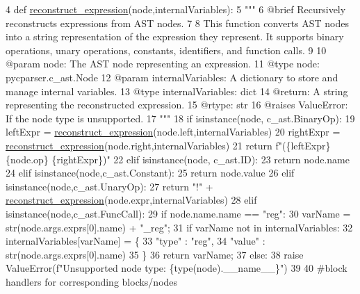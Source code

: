 \begin{DoxyCode}
4 \textcolor{keyword}{def }\hyperlink{namespaceblockHandlers_a5dcb5985c58176982a44686f616daa7f}{reconstruct\_expression}(node,internalVariables):
5     \textcolor{stringliteral}{"""
}
6 \textcolor{stringliteral}{    @brief Recursively reconstructs expressions from AST nodes.
}
7 \textcolor{stringliteral}{
}
8 \textcolor{stringliteral}{    This function converts AST nodes into a string representation of the expression they represent. It
       supports binary operations, unary operations, constants, identifiers, and function calls.
}
9 \textcolor{stringliteral}{
}
10 \textcolor{stringliteral}{    @param node: The AST node representing an expression.
}
11 \textcolor{stringliteral}{    @type node: pycparser.c\_ast.Node
}
12 \textcolor{stringliteral}{    @param internalVariables: A dictionary to store and manage internal variables.
}
13 \textcolor{stringliteral}{    @type internalVariables: dict
}
14 \textcolor{stringliteral}{    @return: A string representing the reconstructed expression.
}
15 \textcolor{stringliteral}{    @rtype: str
}
16 \textcolor{stringliteral}{    @raises ValueError: If the node type is unsupported.
}
17 \textcolor{stringliteral}{    """}
18     \textcolor{keywordflow}{if} isinstance(node, c\_ast.BinaryOp):
19         leftExpr = \hyperlink{namespaceblockHandlers_a5dcb5985c58176982a44686f616daa7f}{reconstruct\_expression}(node.left,internalVariables)
20         rightExpr = \hyperlink{namespaceblockHandlers_a5dcb5985c58176982a44686f616daa7f}{reconstruct\_expression}(node.right,internalVariables)
21         \textcolor{keywordflow}{return} f\textcolor{stringliteral}{"(\{leftExpr\} \{node.op\} \{rightExpr\})"}
22     \textcolor{keywordflow}{elif} isinstance(node, c\_ast.ID):
23         \textcolor{keywordflow}{return} node.name
24     \textcolor{keywordflow}{elif} isinstance(node,c\_ast.Constant):
25         \textcolor{keywordflow}{return} node.value
26     \textcolor{keywordflow}{elif} isinstance(node,c\_ast.UnaryOp):
27         \textcolor{keywordflow}{return} \textcolor{stringliteral}{"!"} + \hyperlink{namespaceblockHandlers_a5dcb5985c58176982a44686f616daa7f}{reconstruct\_expression}(node.expr,internalVariables)
28     \textcolor{keywordflow}{elif} isinstance(node,c\_ast.FuncCall):
29         \textcolor{keywordflow}{if} node.name.name == \textcolor{stringliteral}{"reg"}:
30             varName = str(node.args.exprs[0].name) + \textcolor{stringliteral}{"\_reg"};
31             \textcolor{keywordflow}{if} varName \textcolor{keywordflow}{not} \textcolor{keywordflow}{in} internalVariables:
32                 internalVariables[varName] = \{
33                     \textcolor{stringliteral}{"type"} : \textcolor{stringliteral}{"reg"},
34                     \textcolor{stringliteral}{"value"} : str(node.args.exprs[0].name)
35                 \}
36             \textcolor{keywordflow}{return} varName;
37     \textcolor{keywordflow}{else}:
38         \textcolor{keywordflow}{raise} ValueError(f\textcolor{stringliteral}{"Unsupported node type: \{type(node).\_\_name\_\_\}"})
39 
40 \textcolor{comment}{#block handlers for corresponding blocks/nodes
}
\end{DoxyCode}
